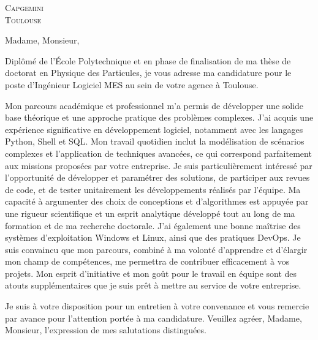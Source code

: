 \documentclass[11pt,a4paper]{lettre}
\begin{document}
\begin{letter} 
{\textsc{Capgemini} \\
\textsc{Toulouse}} %
\\
\address{M. \textsc{Benane} Gaya\\
171 Avenue de Luminy\\
Logement EF38\\
13~009~\textsc{Marseille}}  

\signature{ Gaya \textsc{Benane}}
\nofax
\date{\today}

{}
\opening{\hspace{1em} Madame, Monsieur,}
\hspace{1em}
Diplômé de l'École Polytechnique et en phase de finalisation de ma thèse de doctorat en Physique des Particules, je vous adresse ma candidature pour le poste d'Ingénieur Logiciel MES au sein de votre agence à Toulouse.

\hspace{1em}
Mon parcours académique et professionnel m'a permis de développer une solide base théorique et une approche pratique des problèmes complexes. J'ai acquis une expérience significative en développement logiciel, notamment avec les langages Python, Shell et SQL. Mon travail quotidien inclut la modélisation de scénarios complexes et l'application de techniques avancées, ce qui correspond parfaitement aux missions proposées par votre entreprise.
Je suis particulièrement intéressé par l'opportunité de développer et paramétrer des solutions, de participer aux revues de code, et de tester unitairement les développements réalisés par l'équipe. Ma capacité à argumenter des choix de conceptions et d’algorithmes est appuyée par une rigueur scientifique et un esprit analytique développé tout au long de ma formation et de ma recherche doctorale.
J'ai également une bonne maîtrise des systèmes d'exploitation Windows et Linux, ainsi que des pratiques DevOps. 
Je suis convaincu que mon parcours, combiné à ma volonté d'apprendre et d'élargir mon champ de compétences, me permettra de contribuer efficacement à vos projets. Mon esprit d'initiative et mon goût pour le travail en équipe sont des atouts supplémentaires que je suis prêt à mettre au service de votre entreprise.
\hspace{1em}
\closing{\hspace{1em}
Je suis à votre disposition pour un entretien à votre convenance et vous remercie par avance pour l'attention portée à ma candidature.
Veuillez agréer, Madame, Monsieur, l'expression de mes salutations distinguées.
}
\end{letter}
\end{document}
